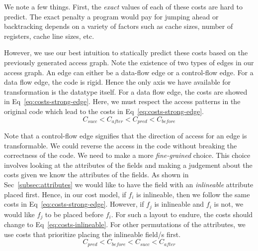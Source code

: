 We note a few things. 
%
First, the {\em exact} values of each of these costs are hard to predict. 
%
The exact penalty a program would pay for jumping ahead or backtracking depends on a variety of factors such as cache sizes, number of registers, cache line sizes, etc.
%
%
%

However, we use our best intuition to statically predict these costs based on the previously generated access graph.
Note the existence of two types of edges in our access graph. An edge can either be a data-flow edge or a control-flow edge.
For a data flow edge, the code is rigid. Hence the only axis we have available for transformation is the datatype itself. For a data flow edge, the costs are showed in Eq~\ref{eq:costs-strong-edge}. Here, we must respect the access patterns in the original code which lead to the costs in Eq~\ref{eq:costs-strong-edge}.
%
\begin{equation}
C_{\mathit{succ}} < C_\mathit{after} < C_\mathit{pred} < C_\mathit{before}
\label{eq:costs-strong-edge}
\end{equation}

Note that a control-flow edge signifies that the direction of access for an edge is transformable. We could reverse the access in the code without breaking the correctness of the code. We need to make a more \textit{fine-grained} choice.
This choice involves looking at the attributes of the fields and making a judgement about the costs given we know the attributes of the fields. As shown in Sec~\ref{subsec:attributes} we would like to have the field with an \textit{inlineable} attribute placed first.
Hence, in our cost model, if $f_i$ is inlineable, then we follow the same costs in Eq~\ref{eq:costs-strong-edge}. However, if $f_j$ is inlineable and $f_i$ is not, we would like $f_j$ to be placed before $f_i$. For such a layout to endure, the costs should change to Eq~\ref{eq:costs-inlineable}.
For other permutations of the attributes, we use costs that prioritize placing the inlineable field/s first. 
\begin{equation}
C_\mathit{pred} < C_\mathit{before} < C_{\mathit{succ}} < C_\mathit{after}
\label{eq:costs-inlineable}
\end{equation}


